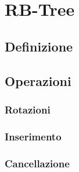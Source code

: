 
\chapter{RB-Tree}

\section{Definizione}
\section{Operazioni}
\subsection{Rotazioni}
\subsection{Inserimento}
\subsection{Cancellazione}